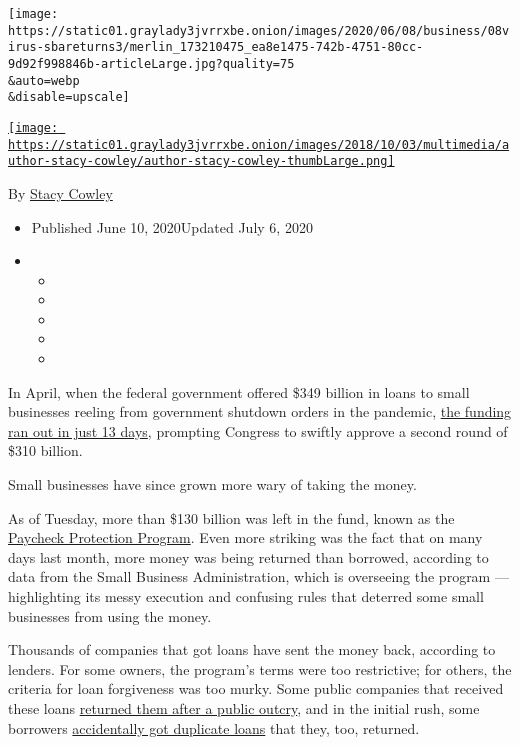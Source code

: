 \texttt{[image: https://static01.graylady3jvrrxbe.onion/images/2020/06/08/business/08virus-sbareturns3/merlin\_173210475\_ea8e1475-742b-4751-80cc-9d92f998846b-articleLarge.jpg?quality=75\\\&auto=webp\\\&disable=upscale]}

\href{https://www.nytimes3xbfgragh.onion/by/stacy-cowley}{\texttt{[image: https://static01.graylady3jvrrxbe.onion/images/2018/10/03/multimedia/author-stacy-cowley/author-stacy-cowley-thumbLarge.png]}}

By \href{https://www.nytimes3xbfgragh.onion/by/stacy-cowley}{Stacy
Cowley}

\begin{itemize}
\item
  Published June 10, 2020Updated July 6, 2020
\item
  \begin{itemize}
  \item
  \item
  \item
  \item
  \item
  \end{itemize}
\end{itemize}

In April, when the federal government offered \$349 billion in loans to
small businesses reeling from government shutdown orders in the
pandemic,
\href{https://www.nytimes3xbfgragh.onion/2020/04/16/business/coronavirus-sba-loans-out-of-money.html}{the
funding ran out in just 13 days}, prompting Congress to swiftly approve
a second round of \$310 billion.

Small businesses have since grown more wary of taking the money.

As of Tuesday, more than \$130 billion was left in the fund, known as
the
\href{https://www.nytimes3xbfgragh.onion/2020/07/06/us/ppp-small-business-loans.html}{Paycheck
Protection Program}. Even more striking was the fact that on many days
last month, more money was being returned than borrowed, according to
data from the Small Business Administration, which is overseeing the
program --- highlighting its messy execution and confusing rules that
deterred some small businesses from using the money.

Thousands of companies that got loans have sent the money back,
according to lenders. For some owners, the program's terms were too
restrictive; for others, the criteria for loan forgiveness was too
murky. Some public companies that received these loans
\href{https://www.nytimes3xbfgragh.onion/2020/05/18/business/ppp-deadline-return-funds-coronavirus.html}{returned
them after a public outcry}, and in the initial rush, some borrowers
\href{https://www.reuters.com/article/us-health-coronavirus-usa-ppp-exclusive/exclusive-us-small-business-program-handed-out-virus-aid-to-many-borrowers-twice-idUSKBN2391S9}{accidentally
got duplicate loans} that they, too, returned.

